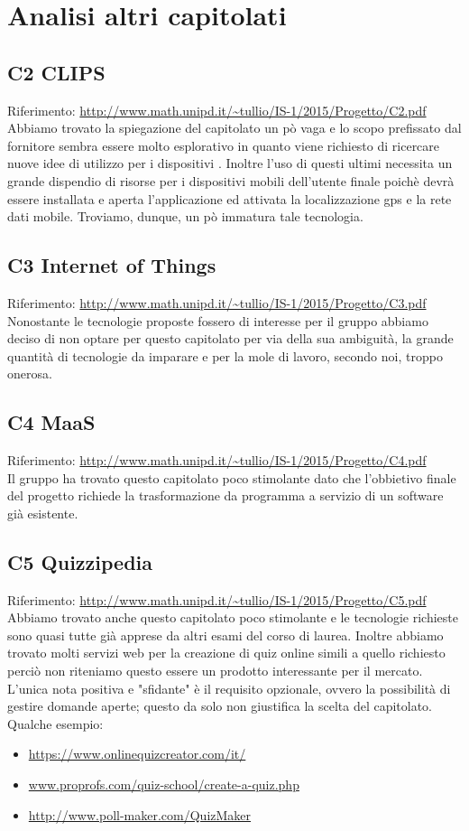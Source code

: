 \documentclass{scalatekids-article}
\begin{document}
\section{Analisi altri capitolati}
\subsection{C2 CLIPS}
Riferimento: \url{http://www.math.unipd.it/~tullio/IS-1/2015/Progetto/C2.pdf}\\
Abbiamo trovato la spiegazione del capitolato un pò vaga e lo scopo prefissato
dal fornitore sembra essere molto esplorativo in quanto viene richiesto di
ricercare nuove idee di utilizzo per i dispositivi . Inoltre l'uso di
questi ultimi necessita un grande dispendio di risorse per i dispositivi mobili
dell'utente finale poichè devrà essere installata e aperta l'applicazione ed
attivata la localizzazione gps e la rete dati mobile. Troviamo, dunque, un pò
immatura tale tecnologia.
\subsection{C3 Internet of Things}
Riferimento: \url{http://www.math.unipd.it/~tullio/IS-1/2015/Progetto/C3.pdf}\\
Nonostante le tecnologie proposte fossero di interesse per il gruppo abbiamo
deciso di non optare per questo capitolato per via della sua ambiguità, la
grande quantità di tecnologie da imparare e per la mole di lavoro, secondo noi,
troppo onerosa.
\subsection{C4 MaaS}
Riferimento: \url{http://www.math.unipd.it/~tullio/IS-1/2015/Progetto/C4.pdf}\\ Il
gruppo ha trovato questo capitolato poco stimolante dato che l'obbietivo finale
del progetto richiede la trasformazione da programma a servizio di un software
già esistente.
\subsection{C5 Quizzipedia}
Riferimento: \url{http://www.math.unipd.it/~tullio/IS-1/2015/Progetto/C5.pdf}\\
Abbiamo trovato anche questo capitolato poco stimolante e le tecnologie
richieste sono quasi tutte già apprese da altri esami del corso di laurea.
Inoltre abbiamo trovato molti servizi web per la creazione di quiz online simili
a quello richiesto perciò non riteniamo questo essere un prodotto interessante
per il mercato. L'unica nota positiva e "sfidante" è il requisito opzionale,
ovvero la possibilità di gestire domande aperte; questo da solo non giustifica
la scelta del capitolato.
Qualche esempio:
\begin{itemize}
\item\url{https://www.onlinequizcreator.com/it/}
\item\url{www.proprofs.com/quiz-school/create-a-quiz.php}
\item\url{http://www.poll-maker.com/QuizMaker}
\end{itemize}
\end{document}
